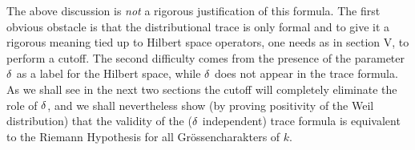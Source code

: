 The above discussion is {\it not\/} a rigorous justification of
this formula. The first obvious obstacle is that the distributional 
trace
 is only formal and to give it a rigorous meaning tied up to Hilbert 
space operators, one needs as in section V, to perform a cutoff.
 The second difficulty comes from the presence of the parameter
 $\delta$ as a label for the 
Hilbert space, while $\delta$ does not appear in the trace formula.
 As we shall see in the next two sections the cutoff will 
completely eliminate the role of $\delta$, and we shall
 nevertheless show (by proving positivity of the Weil distribution)
 that the validity of the ($\delta$ independent) trace formula
 is equivalent to the Riemann Hypothesis for all Gr\"ossencharakters of 
$k$.
 
\vglue 1cm


